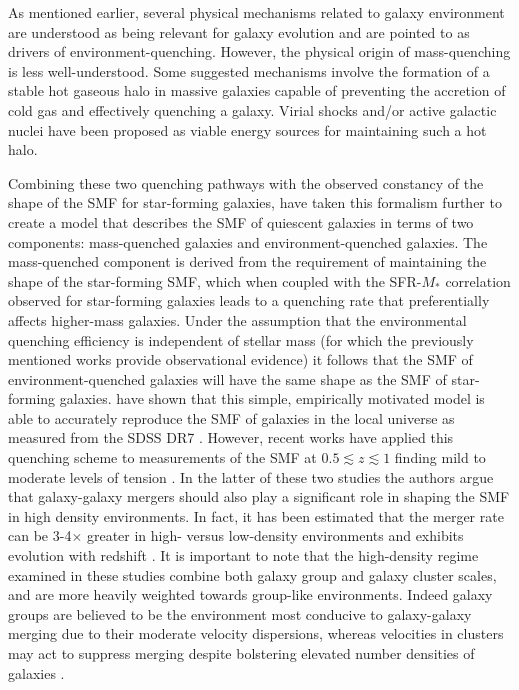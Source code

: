 \documentclass[a4paper,fleqn,usenatbib]{mnras}
\begin{document}
As mentioned earlier, several physical mechanisms related to galaxy environment are understood as being relevant for galaxy evolution and are pointed to as drivers of environment-quenching.
However, the physical origin of mass-quenching is less well-understood.
Some suggested mechanisms involve the formation of a stable hot gaseous halo in massive galaxies capable of preventing the accretion of cold gas and effectively quenching a galaxy.
Virial shocks \citep{Birnboim2003} and/or active galactic nuclei \citep{Croton2006} have been proposed as viable energy sources for maintaining such a hot halo.


Combining these two quenching pathways with the observed constancy of the shape of the SMF for star-forming galaxies, \citet{Peng2010} have taken this formalism further to create a model that describes the SMF of quiescent galaxies in terms of two components: mass-quenched galaxies and environment-quenched galaxies.
The mass-quenched component is derived from the requirement of maintaining the shape of the star-forming SMF, which when coupled with the SFR-$M_*$ correlation observed for star-forming galaxies \citep[e.g.][]{Noeske2007} leads to a quenching rate that preferentially affects higher-mass galaxies.
Under the assumption that the environmental quenching efficiency is independent of stellar mass (for which the previously mentioned works provide observational evidence) it follows that the SMF of environment-quenched galaxies will have the same shape as the SMF of star-forming galaxies.
\citet{Peng2010} have shown that this simple, empirically motivated model is able to accurately reproduce the SMF of galaxies in the local universe as measured from the SDSS DR7 \citep{Abazajian2009}.
However, recent works have applied this quenching scheme to measurements of the SMF at $0.5 \lesssim z \lesssim 1$ finding mild to moderate levels of tension \citep{vanderBurg2013, Davidzon2016}.
In the latter of these two studies the authors argue that galaxy-galaxy mergers should also play a significant role in shaping the SMF in high density environments.
In fact, it has been estimated that the merger rate can be 3-4$\times$ greater in high- versus low-density environments \citep{Lin2010, Kampczyk2013} and exhibits evolution with redshift \citep{LopezSanjuan2013}.
It is important to note that the high-density regime examined in these studies combine both galaxy group and galaxy cluster scales, and are more heavily weighted towards group-like environments.
Indeed galaxy groups are believed to be the environment most conducive to galaxy-galaxy merging due to their moderate velocity dispersions, whereas velocities in clusters may act to suppress merging despite bolstering elevated number densities of galaxies \citep{Lin2010}.
\end{document}
